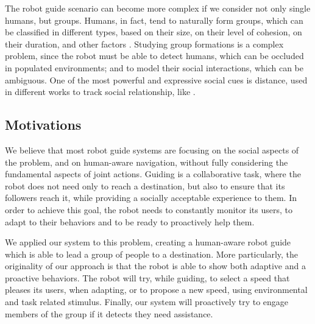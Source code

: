 The robot guide scenario can become more complex if we consider not only single humans, but groups. Humans, in fact, tend to naturally form groups, which can be classified in different types, based on their size, on their level of cohesion, on their duration, and other factors \citep{forsyth2009group}.  Studying group formations is a complex problem, since the robot must be able to detect humans, which can be occluded in populated environments; and to model their social interactions, which can be ambiguous. One of the most powerful and expressive social cues is distance, used in different works to track social relationship, like \cite{luber2013multi}. 

\subsection{Motivations}
We believe that most robot guide systems are focusing on the social aspects of the problem, and on human-aware navigation, without fully considering the fundamental aspects of joint actions. Guiding is a collaborative task, where the robot does not need only to reach a destination, but also to ensure that its followers reach it, while providing a socially acceptable experience to them. In order to achieve this goal, the robot needs to constantly monitor its users, to adapt to their behaviors and to be ready to proactively help them.

We applied our system to this problem, creating a human-aware robot guide which is able to lead a group of people to a destination. More particularly, the originality of our approach is that the robot is able to show both adaptive and a proactive behaviors. The robot will try, while guiding, to select a speed that pleases its users, when adapting, or to propose a new speed, using environmental and task related stimulus. Finally, our system will proactively try to engage members of the group if it detects they need assistance. 


